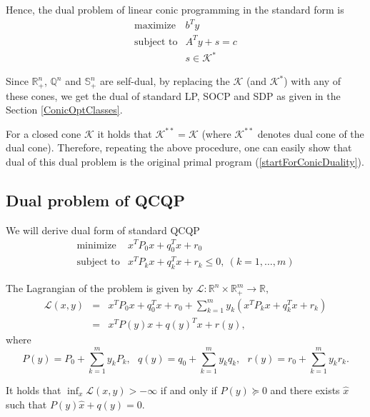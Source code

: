\documentclass[12pt]{book}
\theoremstyle{definition}
\begin{document}
Hence, the dual problem of linear conic programming in the standard form is 
\begin{equation}
 \begin{array}{ll}
\mbox{maximize} & b^Ty\\
\mbox{subject to}& A^Ty + s = c\\
& s \in \mathcal{K}^*
\end{array}
\end{equation}

Since $\mathbb{R}^n_+$, $\mathbb{Q}^n$ and $\mathbb{S}^n_+$ are self-dual, by replacing the $\mathcal{K}$ (and $\mathcal{K}^*$) with any of these cones, we get 
the dual of standard LP, SOCP and SDP as given in the Section \ref{ConicOptClasses}.


\rem \label{doubleDualConeProg} For a closed cone $\mathcal{K}$ it holds that $\mathcal{K}^{**} = \mathcal{K}$ (where $\mathcal{K}^{**}$ denotes dual cone of the dual cone). Therefore, repeating the above procedure, one can easily show that dual of this dual problem is the original primal program (\ref{startForConicDuality}).




\subsection{Dual problem of QCQP}


We will derive dual form of standard QCQP
\begin{equation}
\begin{array}{ll}
\mbox{minimize}& x^TP_0x + q_0^Tx + r_0 \\
\mbox{subject to}& x^TP_kx + q_k^Tx + r_k \leq 0, \  (k = 1,\dots ,m)
\end{array} 
\end{equation}

The Lagrangian of the problem is given by $\mathcal{L}: \mathbb{R}^n\times\mathbb{R}^m_+ \rightarrow \mathbb{R},$
\begin{eqnarray}
\mathcal{L}(x,y) &=&  x^TP_0x + q_0^Tx + r_0 + \sum_{k=1}^m y_k(x^TP_kx + q_k^Tx + r_k) \\
 &=& x^TP(y)x + q(y)^Tx + r(y),
\end{eqnarray}
where %
\begin{equation} 
P(y) = P_0 + \sum_{k = 1}^m y_kP_k, \ \ \  q(y) = q_0 + \sum_{k = 1}^m y_kq_k, \ \ \ r(y) = r_0 + \sum_{k =1}^m y_kr_k. 
\end{equation}

It holds that $\inf_x\mathcal{L}(x,y) > -\infty$ if and only if $P(y)\succeq 0$ and there exists $\hat{x}$ such that  $P(y)\hat{x} + q(y) = 0.$
\end{document}
